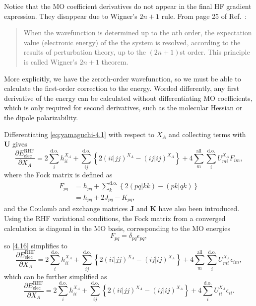 \documentclass[%
class = book,%
crop = false,%
float = true,%
multi = true,%
preview = false,%
]{standalone}
\begin{document}
Notice that the MO coefficient derivatives do not appear in the final HF gradient expression. They disappear due to Wigner's \(2n + 1\) rule. From page 25 of Ref.~\parencite{Yamaguchi1994}:
\begin{quote}
  When the wavefunction is determined up to the \(n\)th order, the expectation value (electronic energy) of the the system is resolved, according to the results of perturbation theory, up to the \((2n+1)\)st order. This principle is called Wigner's \(2n+1\) theorem\cite{doi:10.1063/1.1668053,EPSTEIN1980311}.
\end{quote}
More explicitly, we have the zeroth-order wavefunction, so we must be able to calculate the first-order correction to the energy. Worded differently, any first derivative of the energy can be calculated without differentiating MO coefficients, which is only required for second derivatives, such as the molecular Hessian or the dipole polarizability.

Differentiating \eqref{eq:yamaguchi-4.1} with respect to \(X_{A}\) and collecting terms with \(\mathbf{U}\) gives
\begin{equation}
  \label{4.16}\tag{Yamaguchi eq. 4.16}
  \frac{\partial E_{\text{elec}}^{\text{RHF}}}{\partial X_{A}} = 2 \sum_{i}^{\text{d.o.}} h_{ii}^{X_{A}} + \sum_{ij}^{\text{d.o.}} \left\{ 2(ii|jj)^{X_{A}} - (ij|ij)^{X_{A}} \right\} + 4 \sum_{m}^{\text{all}} \sum_{i}^{\text{d.o.}} U_{mi}^{X_{A}} F_{im},
\end{equation}
where the Fock matrix is defined as
\begin{equation}
  \label{eq:yamaguchi-4.6} \tag{Yamaguchi eq. 4.6}
  \begin{aligned}
    F_{pq} &= h_{pq} + \sum_{k}^{\text{d.o.}} \left\{ 2(pq|kk) - (pk|qk) \right\} \\
    &= h_{pq} + 2J_{pq} - K_{pq},
  \end{aligned}
\end{equation}
and the Coulomb and exchange matrices \(\mathbf{J}\) and \(\mathbf{K}\) have also been introduced. Using the RHF variational conditions, the Fock matrix from a converged calculation is diagonal in the MO basis, corresponding to the MO energies
\begin{equation}
  F_{pq} = \delta_{pq} \epsilon_{pq}, \tag{Yamaguchi eq. 4.7}
\end{equation}
so \eqref{4.16} simplifies to
\begin{equation}
  \frac{\partial E_{\text{elec}}^{\text{RHF}}}{\partial X_{A}} = 2 \sum_{i}^{\text{d.o.}} h_{ii}^{X_{A}} + \sum_{ij}^{\text{d.o.}} \left\{ 2(ii|jj)^{X_{A}} - (ij|ij)^{X_{A}} \right\} + 4 \sum_{m}^{\text{all}} \sum_{i}^{\text{d.o.}} U_{mi}^{X_{A}} \epsilon_{im}, \tag{Yamaguchi eq. 4.17 modified}
\end{equation}
which can be further simplified as
\begin{equation}
  \frac{\partial E_{\text{elec}}^{\text{RHF}}}{\partial X_{A}} = 2 \sum_{i}^{\text{d.o.}} h_{ii}^{X_{A}} + \sum_{ij}^{\text{d.o.}} \left\{ 2(ii|jj)^{X_{A}} - (ij|ij)^{X_{A}} \right\} + 4 \sum_{i}^{\text{d.o.}} U_{ii}^{X_{A}} \epsilon_{ii}. \tag{Yamaguchi eq. 4.17}
\end{equation}
\end{document}
